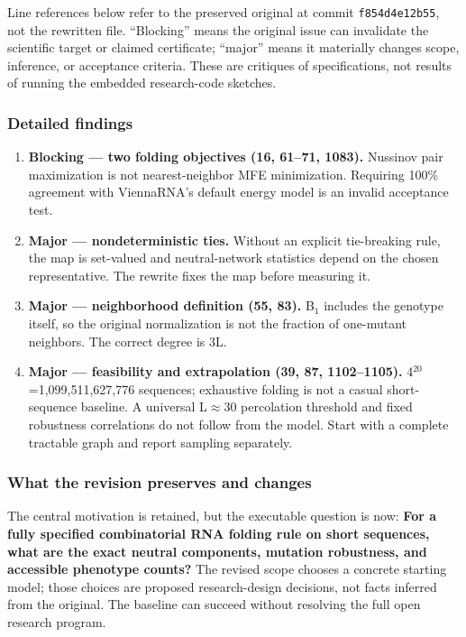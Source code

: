 \documentclass[
  11pt,
]{article}
\begin{document}
Line references below refer to the preserved original at commit
\texttt{f854d4e12b55}, not the rewritten file. ``Blocking'' means the
original issue can invalidate the scientific target or claimed
certificate; ``major'' means it materially changes scope, inference, or
acceptance criteria. These are critiques of specifications, not results
of running the embedded research-code sketches.

\subsubsection{Detailed findings}

\begin{enumerate}
\def\labelenumi{\arabic{enumi}.}
\item
  \textbf{Blocking --- two folding objectives (16, 61--71, 1083).}
  Nussinov pair maximization is not nearest-neighbor MFE minimization.
  Requiring 100\% agreement with ViennaRNA's default energy model is an
  invalid acceptance test.
\item
  \textbf{Major --- nondeterministic ties.} Without an explicit
  tie-breaking rule, the map is set-valued and neutral-network
  statistics depend on the chosen representative. The rewrite fixes the
  map before measuring it.
\item
  \textbf{Major --- neighborhood definition (55, 83).}
  B\ensuremath{{}_{1}} includes the genotype itself, so the original
  normalization is not the fraction of one-mutant neighbors. The correct
  degree is 3L.
\item
  \textbf{Major --- feasibility and extrapolation (39, 87, 1102--1105).}
  4\ensuremath{{}^{20}}=1,099,511,627,776 sequences; exhaustive folding
  is not a casual short-sequence baseline. A universal
  L\ensuremath{\approx}30 percolation threshold and fixed robustness
  correlations do not follow from the model. Start with a complete
  tractable graph and report sampling separately.
\end{enumerate}

\subsubsection{What the revision preserves and changes}

The central motivation is retained, but the executable question is now:
\textbf{For a fully specified combinatorial RNA folding rule on short
sequences, what are the exact neutral components, mutation robustness,
and accessible phenotype counts?} The revised scope chooses a concrete
starting model; those choices are proposed research-design decisions,
not facts inferred from the original. The baseline can succeed without
resolving the full open research program.
\end{document}
